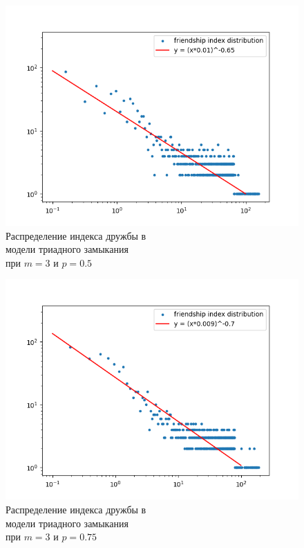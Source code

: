 \documentclass[bachelor, och, diploma]{SCWorks}
\begin{document}
\begin{figure}[!ht]
    \centering
    \includegraphics[scale=0.5]{diploma_results/static_log/triad_dist_beta_3_0.5.png}
    \caption{Распределение индекса дружбы  в\\ модели триадного замыкания\\ при $m=3$ и $p=0.5$}
\end{figure}
\begin{figure}[!ht]
    \centering
    \includegraphics[scale=0.5]{diploma_results/static_log/triad_dist_beta_3_0.75.png}
    \caption{Распределение индекса дружбы  в\\ модели триадного замыкания\\ при $m=3$ и $p=0.75$}
\end{figure}
\end{document}

